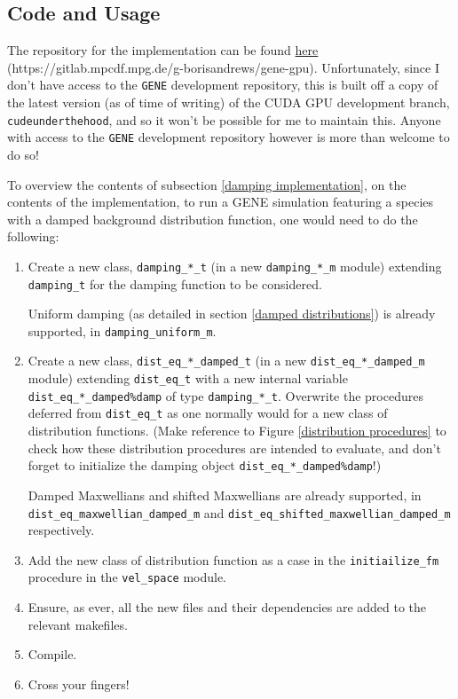 \subsection{Code and Usage}
    The repository for the implementation can be found \href{https://gitlab.mpcdf.mpg.de/g-borisandrews/gene-gpu}{here} (https://gitlab.mpcdf.mpg.de/g-borisandrews/gene-gpu). Unfortunately, since I don't have access to the {\tt GENE} development repository, this is built off a copy of the latest version (as of time of writing) of the CUDA GPU development branch, {\tt cudeunderthehood}, and so it won't be possible for me to maintain this. Anyone with access to the {\tt GENE} development repository however is more than welcome to do so!

    To overview the contents of subsection \ref{damping implementation}, on the contents of the implementation, to run a {\rm GENE} simulation featuring a species with a damped background distribution function, one would need to do the following:
    \begin{enumerate}
        \item  Create a new class, {\tt damping\_*\_t} (in a new {\tt damping\_*\_m} module) extending {\tt damping\_t} for the damping function to be considered.
        
        Uniform damping (as detailed in section \ref{damped distributions}) is already supported, in {\tt damping\_uniform\_m}.

        \item  Create a new class, {\tt dist\_eq\_*\_damped\_t} (in a new {\tt dist\_eq\_*\_damped\_m} module) extending {\tt dist\_eq\_t} with a new internal variable {\tt dist\_eq\_*\_damped\%damp} of type {\tt damping\_*\_t}. Overwrite the procedures deferred from {\tt dist\_eq\_t} as one normally would for a new class of distribution functions. (Make reference to Figure \ref{distribution procedures} to check how these distribution procedures are intended to evaluate, and don't forget to initialize the damping object {\tt dist\_eq\_*\_damped\%damp}!)

        Damped Maxwellians and shifted Maxwellians are already supported, in \\ {\tt dist\_eq\_maxwellian\_damped\_m} and {\tt dist\_eq\_shifted\_maxwellian\_damped\_m} \\ respectively.

        \item  Add the new class of distribution function as a case in the {\tt initiailize\_fm} procedure in the {\tt vel\_space} module.

        \item  Ensure, as ever, all the new files and their dependencies are added to the relevant makefiles.

        \item  Compile.

        \item  Cross your fingers!
    \end{enumerate}
    